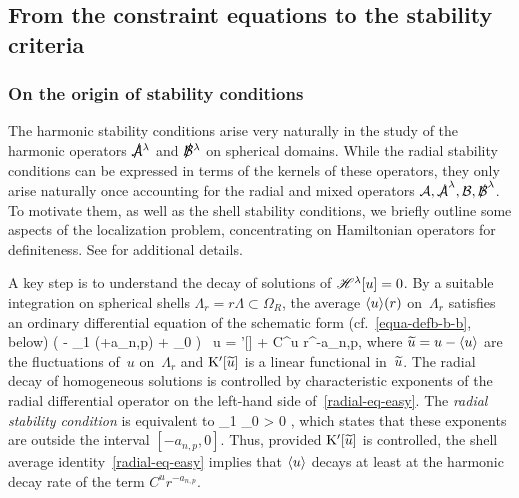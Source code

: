 \documentclass[11pt]{article}
\numberwithin{table}{section}
\numberwithin{equation}{section}
\numberwithin{table}{section}
\numberwithin{figure}{section}
\begin{document}

\subsection{From the constraint equations to the stability criteria}
\label{sectionN3-stability-bridge}

\subsubsection{On the origin of stability conditions}

The harmonic stability conditions arise very naturally in the study of the harmonic operators $\ssA^\lambda$ and $\ssB^\lambda$ on spherical domains.  While the radial stability conditions can be expressed in terms of the kernels of these operators, they only arise naturally once accounting for the radial and mixed operators $\mathcal A,\slashed {\mathcal A}^\lambda,\mathcal B,\slashed {\mathcal B}^\lambda$.
To motivate them, as well as the shell stability conditions, we briefly outline some aspects of the localization problem, concentrating on Hamiltonian operators for definiteness.  See \cite[Section 1.3]{LL-optimal-main} for additional details.

A key step is to understand the decay of solutions of $\mathscr{H}^\lambda[u] = 0$.
By a suitable integration on spherical shells $\Lambda_r = r\Lambda \subset \Omega_R$, the average $\langle u\rangle(r)$ on~$\Lambda_r$ satisfies an ordinary differential equation of the schematic form (cf.~\eqref{equa-defb-b-b}, below)
\bigl( - \bnotreH_{1} \vartheta(\vartheta+a_{n,p}) + \bnotreH_{0} \bigr) \, \la u\ra 
= \Kappa'[\ut] + C^u r^{-a_{n,p}}, 
\ee
where $\widetilde{u} = u - \langle u\rangle$ are the fluctuations of~$u$ on~$\Lambda_r$ and $\mathrm{K}'[\widetilde{u}]$ is a linear functional in~$\widetilde{u}$.
The radial decay of homogeneous solutions is controlled by characteristic exponents of the radial differential operator on the left-hand side of~\eqref{radial-eq-easy}.
The \emph{radial stability condition} is equivalent to
\be
\bnotreH_{1} \bnotreH_{0} > 0 ,
\ee
which states that these exponents are outside the interval $[-a_{n,p},0]$.
Thus, provided $\mathrm{K}'[\widetilde{u}]$ is controlled, the shell average identity~\eqref{radial-eq-easy} implies that $\langle u\rangle$ decays at least at the harmonic decay rate of the term $C^u r^{-a_{n,p}}$.
\end{document}
